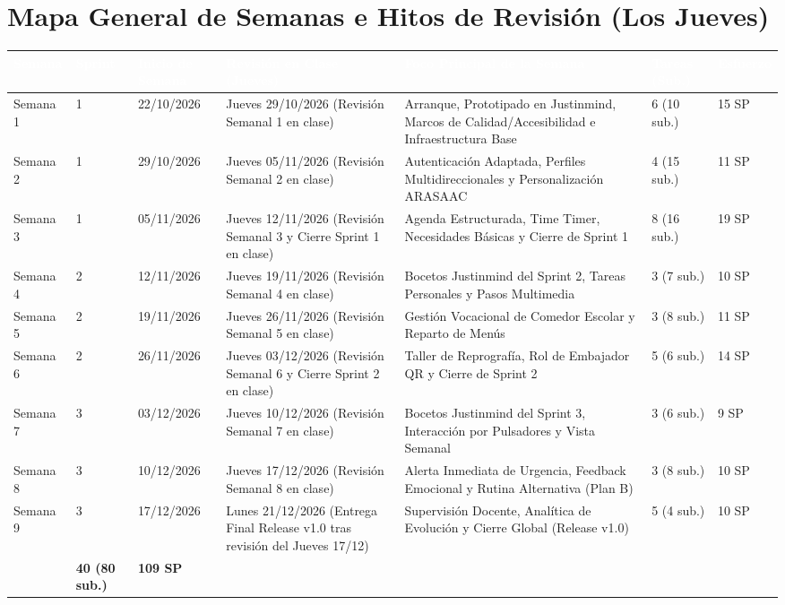 \documentclass[11pt,a4paper]{article}
\newcommand{\cab}[1]{\textcolor{white}{\small\textbf{#1}}}
\begin{document}
\section{Mapa General de Semanas e Hitos de Revisión (Los Jueves)}
\begin{longtable}{|C{1.3cm}|C{1.2cm}|C{1.9cm}|P{3.3cm}|P{3.6cm}|C{1.3cm}|C{1.5cm}|}
\hline
{}\cab{Semana} & \cab{Sprint} & \cab{Inicio de Semana} & \cab{Revisión en Clase (Jueves)} & \cab{Foco Principal de la Semana} & \cab{Tareas (Sub.)} & \cab{Esfuerzo} \\ \hline
\endhead
\small Semana 1 & 1 & 22/10/2026 & Jueves 29/10/2026 (Revisión Semanal 1 en clase) & Arranque, Prototipado en Justinmind, Marcos de Calidad/Accesibilidad e Infraestructura Base & 6 (10 sub.) & 15 SP \\ \hline
\small Semana 2 & 1 & 29/10/2026 & Jueves 05/11/2026 (Revisión Semanal 2 en clase) & Autenticación Adaptada, Perfiles Multidireccionales y Personalización ARASAAC & 4 (15 sub.) & 11 SP \\ \hline
\small Semana 3 & 1 & 05/11/2026 & Jueves 12/11/2026 (Revisión Semanal 3 y Cierre Sprint 1 en clase) & Agenda Estructurada, Time Timer, Necesidades Básicas y Cierre de Sprint 1 & 8 (16 sub.) & 19 SP \\ \hline
\small Semana 4 & 2 & 12/11/2026 & Jueves 19/11/2026 (Revisión Semanal 4 en clase) & Bocetos Justinmind del Sprint 2, Tareas Personales y Pasos Multimedia & 3 (7 sub.) & 10 SP \\ \hline
\small Semana 5 & 2 & 19/11/2026 & Jueves 26/11/2026 (Revisión Semanal 5 en clase) & Gestión Vocacional de Comedor Escolar y Reparto de Menús & 3 (8 sub.) & 11 SP \\ \hline
\small Semana 6 & 2 & 26/11/2026 & Jueves 03/12/2026 (Revisión Semanal 6 y Cierre Sprint 2 en clase) & Taller de Reprografía, Rol de Embajador QR y Cierre de Sprint 2 & 5 (6 sub.) & 14 SP \\ \hline
\small Semana 7 & 3 & 03/12/2026 & Jueves 10/12/2026 (Revisión Semanal 7 en clase) & Bocetos Justinmind del Sprint 3, Interacción por Pulsadores y Vista Semanal & 3 (6 sub.) & 9 SP \\ \hline
\small Semana 8 & 3 & 10/12/2026 & Jueves 17/12/2026 (Revisión Semanal 8 en clase) & Alerta Inmediata de Urgencia, Feedback Emocional y Rutina Alternativa (Plan B) & 3 (8 sub.) & 10 SP \\ \hline
\small Semana 9 & 3 & 17/12/2026 & Lunes 21/12/2026 (Entrega Final Release v1.0 tras revisión del Jueves 17/12) & Supervisión Docente, Analítica de Evolución y Cierre Global (Release v1.0) & 5 (4 sub.) & 10 SP \\ \hline
{} & \textbf{40 (80 sub.)} & \textbf{109 SP} \\ \hline
\end{longtable}
\end{document}
